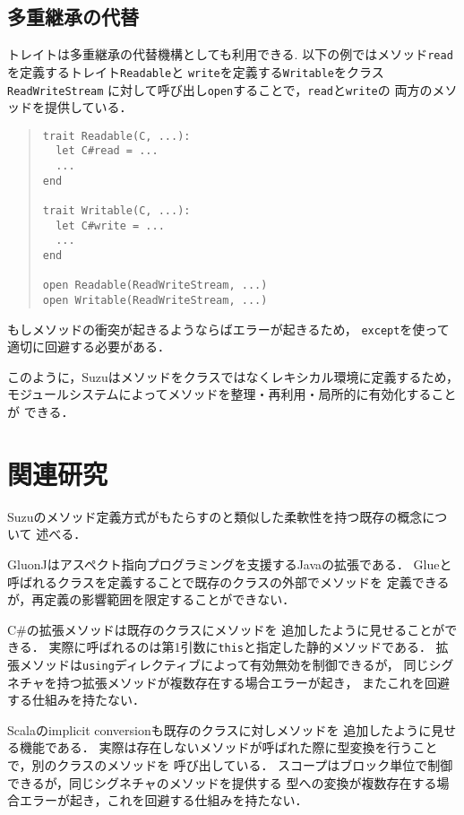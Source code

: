 \documentclass[a4paper,11pt,dvipdfmx]{jreport}
\begin{document}
\section{多重継承の代替}

トレイトは多重継承の代替機構としても利用できる.
以下の例ではメソッド\verb|read|を定義するトレイト\verb|Readable|と
\verb|write|を定義する\verb|Writable|をクラス\verb|ReadWriteStream|
に対して呼び出し\verb|open|することで，\verb|read|と\verb|write|の
両方のメソッドを提供している．
\begin{quote}
\begin{verbatim}
trait Readable(C, ...):
  let C#read = ...
  ...
end

trait Writable(C, ...):
  let C#write = ...
  ...
end

open Readable(ReadWriteStream, ...)
open Writable(ReadWriteStream, ...)
\end{verbatim}
\end{quote}
もしメソッドの衝突が起きるようならばエラーが起きるため，
\verb|except|を使って適切に回避する必要がある．

このように，Suzuはメソッドをクラスではなくレキシカル環境に定義するため，
モジュールシステムによってメソッドを整理・再利用・局所的に有効化することが
できる．


\chapter{関連研究}
\label{chapter:related-work}

Suzuのメソッド定義方式がもたらすのと類似した柔軟性を持つ既存の概念について
述べる．

GluonJ\cite{GluonJ}はアスペクト指向プログラミングを支援するJavaの拡張である．
Glueと呼ばれるクラスを定義することで既存のクラスの外部でメソッドを
定義できるが，再定義の影響範囲を限定することができない．

C\#の拡張メソッド\cite{ExtentionMethods}は既存のクラスにメソッドを
追加したように見せることができる．
実際に呼ばれるのは第1引数に\verb|this|と指定した静的メソッドである．
拡張メソッドは\verb|using|ディレクティブによって有効無効を制御できるが，
同じシグネチャを持つ拡張メソッドが複数存在する場合エラーが起き，
またこれを回避する仕組みを持たない．

Scala\cite{Scala}のimplicit conversionも既存のクラスに対しメソッドを
追加したように見せる機能である．
実際は存在しないメソッドが呼ばれた際に型変換を行うことで，別のクラスのメソッドを
呼び出している．
スコープはブロック単位で制御できるが，同じシグネチャのメソッドを提供する
型への変換が複数存在する場合エラーが起き，これを回避する仕組みを持たない．
\end{document}
